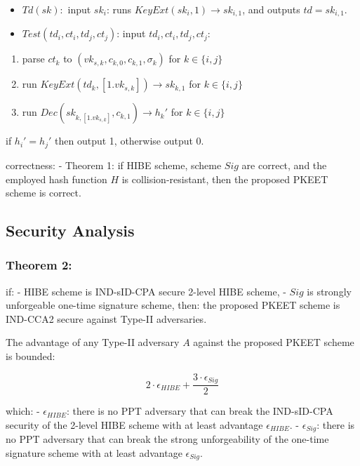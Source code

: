 \documentclass[
]{article}
\begin{document}
\begin{itemize}
\item
  \(Td(sk):\) input \({sk}_i\): runs
  \(KeyExt({sk}_i,1)\rightarrow {sk}_{i,1}\), and outputs
  \(td = {sk}_{i,1}\).
\item
  \(Test({td}_i, ct_i, {td}_j, ct_j)\): input
  \(td_i, ct_i, td_j, ct_j\):
\end{itemize}

\begin{enumerate}
\def\labelenumi{\arabic{enumi}.}
\item
  parse \({ct}_k\) to \(({vk}_{s,k}, c_{k,0}, c_{k,1}, \sigma_k)\) for
  \(k \in \{i, j\}\)
\item
  run \(KeyExt({td}_k,[1.{vk}_{s,k}])\rightarrow {sk}_{k,1}\) for
  \(k \in \{i, j\}\)
\item
  run \(Dec({sk}_{k,[1.{vk}_{s,k}]}, c_{k,1})\rightarrow h_k'\) for
  \(k \in \{i, j\}\)
\end{enumerate}

if \(h_i' = h_j'\) then output 1, otherwise output 0.

correctness: - Theorem 1: if HIBE scheme, scheme \(Sig\) are correct,
and the employed hash function \(H\) is collision-resistant, then the
proposed PKEET scheme is correct.

\hypertarget{security-analysis}{%
\subsection{Security Analysis}\label{security-analysis}}

\hypertarget{theorem-2}{%
\subsubsection{Theorem 2:}\label{theorem-2}}

if: - HIBE scheme is IND-sID-CPA secure 2-level HIBE scheme, - \(Sig\)
is strongly unforgeable one-time signature scheme, then: the proposed
PKEET scheme is IND-CCA2 secure against Type-II adversaries.

The advantage of any Type-II adversary \(A\) against the proposed PKEET
scheme is bounded:

\[
2\cdot \epsilon_{HIBE}+ \frac{3\cdot \epsilon_{Sig}}{2} 
\]

which: - \(\epsilon_{HIBE}\): there is no PPT adversary that can break
the IND-sID-CPA security of the 2-level HIBE scheme with at least
advantage \(\epsilon_{HIBE}\). - \(\epsilon_{Sig}\): there is no PPT
adversary that can break the strong unforgeability of the one-time
signature scheme with at least advantage \(\epsilon_{Sig}\).
\end{document}
